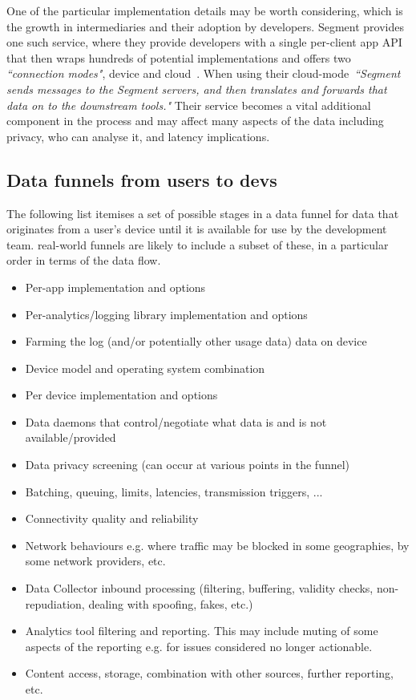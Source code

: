 One of the particular implementation details may be worth considering, which is the growth in intermediaries and their adoption by developers. Segment provides one such service, where they provide developers with a single per-client app API that then wraps hundreds of potential implementations and offers two \emph{``connection modes"}, device and cloud~. When using their cloud-mode~\emph{``Segment sends messages to the Segment servers, and then translates and forwards that data on to the downstream tools."} Their service becomes a vital additional component in the process and may affect many aspects of the data including privacy, who can analyse it, and latency implications.   

\subsection{Data funnels from users to devs}
The following list itemises a set of possible stages in a data funnel for data that originates from a user's device until it is available for use by the development team. real-world funnels are likely to include a subset of these, in a particular order in terms of the data flow.

\begin{itemize}
    \item Per-app implementation and options
    \item Per-analytics/logging library implementation and options
    \item Farming the log (and/or potentially other usage data) data on device
    \item Device model and operating system combination
    \item Per device implementation and options
    \item Data daemons that control/negotiate what data is and is not available/provided
    \item Data privacy screening (can occur at various points in the funnel)
    \item Batching, queuing, limits, latencies, transmission triggers, ...
    \item Connectivity quality and reliability
    \item Network behaviours e.g. where traffic may be blocked in some geographies, by some network providers, etc.
    \item Data Collector inbound processing (filtering, buffering, validity checks, non-repudiation, dealing with spoofing, fakes, etc.)
    \item Analytics tool filtering and reporting. This may include muting of some aspects of the reporting e.g. for issues considered no longer actionable. 
    \item Content access, storage, combination with other sources, further reporting, etc.
\end{itemize}

